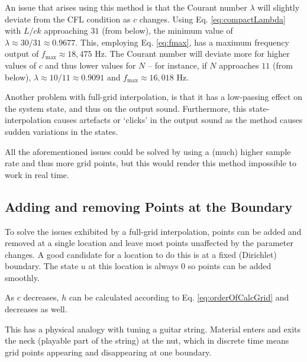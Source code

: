 An issue that arises using this method is that the Courant number $\lambda$ will slightly deviate from the CFL condition as $c$ changes. Using Eq. \eqref{eq:compactLambda} with $L/ck$ approaching $31$ (from below), the minimum value of $\lambda \approx 30/31 \approx 0.9677$.
This, employing Eq. \eqref{eq:fmax}, has a maximum frequency output of $f_\text{max} \approx 18,475$ Hz. 
The Courant number will deviate more for higher values of $c$ and thus lower values for $N$ -- for instance, if $N$ approaches $11$ (from below), $\lambda \approx 10/11 \approx 0.9091$ and $f_\text{max} \approx 16,018$ Hz.

Another problem with full-grid interpolation, is that it has a low-passing effect on the system state, and thus on the output sound. %
Furthermore, this state-interpolation causes artefacts or `clicks' in the output sound as the method causes sudden variations in the states.  

All the aforementioned issues could be solved by using a (much) higher sample rate and thus more grid points, but this would render this method impossible to work in real time.

\subsection{Adding and removing Points at the Boundary}\label{sec:addAtBoundary}
To solve the issues exhibited by a full-grid interpolation, points can be added and removed at a single location and leave most points unaffected by the parameter changes. A good candidate for a location to do this is at a fixed (Dirichlet) boundary. The state $u$ at this location is always $0$ so points can be added smoothly. 

As $c$ decreases, $h$ can be calculated according to Eq. \eqref{eq:orderOfCalcGrid} and decreases as well.

This has a physical analogy with tuning a guitar string. Material enters and exits the neck (playable part of the string) at the nut, which in discrete time means grid points appearing and disappearing at one boundary.

